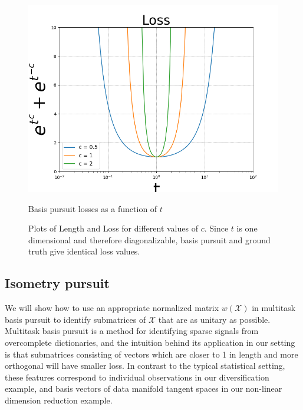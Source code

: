 \begin{figure}[htbp]
    \begin{minipage}{0.32\textwidth}
        \centering
        \includegraphics[width=\textwidth]{../figures/Figure_1b.png}
        \caption{Basis pursuit losses as a function of $t$}
        \label{fig:loss}
    \end{minipage}
    \caption{Plots of Length and Loss for different values of $c$.
    Since $t$ is one dimensional and therefore diagonalizable, basis pursuit and ground truth give identical loss values.}
    \label{fig:results}
\end{figure}

\subsection{Isometry pursuit}

We will show how to use an appropriate normalized matrix $w(\mathcal X)$ in multitask basis pursuit to identify submatrices of $\mathcal X$ that are as unitary as possible.
Multitask basis pursuit is a method for identifying sparse signals from overcomplete dictionaries, and the intuition behind its application in our setting is that submatrices consisting of vectors which are closer to 1 in length and more orthogonal will have smaller loss.
In contrast to the typical statistical setting, these features correspond to individual observations in our diversification example, and basis vectors of data manifold tangent spaces in our non-linear dimension reduction example.

